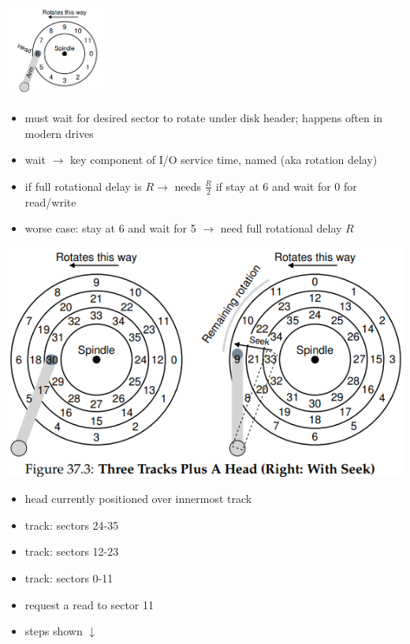 \begin{minipage}{.35\linewidth}
  \includegraphics[width=\linewidth,height=3cm]{imgs/disk_stah}
\end{minipage}
\begin{minipage}{.65\linewidth}
  \flushleft
  \begin{itemize}
  \item must wait for desired sector to rotate under disk header; happens often in modern drives
  \item wait $\to$ key component of I/O service time, named  (aka rotation delay)
  \item if full rotational delay is $R \to$ needs $\frac{R}{2}$ if stay at 6 and wait for 0 for read/write
  \item worse case: stay at 6 and wait for 5 $\to$ need full rotational delay $R$
  \end{itemize}
\end{minipage}
\begin{minipage}{.75\linewidth}
  \includegraphics[width=\linewidth]{imgs/disk_3tracks}
\end{minipage}
\begin{minipage}{.25\linewidth}
  \flushleft
  \begin{itemize}
  \item head currently positioned over innermost track
  \item {} track: sectors 24-35
  \item {} track: sectors 12-23
  \item {} track: sectors 0-11
  \item request a read to sector 11
  \item steps shown $\downarrow$
  \end{itemize}
\end{minipage}
